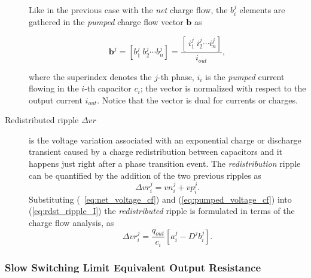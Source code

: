 \begin{description}
      Like in the previous case with the \emph{net} charge flow, the $b_i^j$ elements are gathered in the \emph{pumped} charge flow vector $\mathbf{b}$ as
      
      \begin{equation}
        \mathbf{b}^j =  \left[ b_1^j~b_2^j \cdots b_n^j \right] = \frac{\left[ ~i_1^j~i_2^j \cdots i_n^j \right]}{i_{out}},
      \label{eq:b_vector}
      \end{equation}
      
      where the superindex denotes the $j$-th phase, $i_i$ is the \emph{pumped} current flowing in the $i$-th capacitor $c_i$; the vector is normalized with respect to the output current $i_{out}$. Notice that the vector is dual for currents or charges. 
      

  \item[Redistributed ripple $\Delta vr$ ]is the voltage variation associated with an exponential charge or discharge transient caused by a charge redistribution between capacitors and it happens just right after a phase transition event. The \emph{redistribution} ripple can be quantified by the addition of the two previous ripples as
      \begin{equation}
        \Delta {vr}^j_i  = {vn}^j_i + {vp}^j_i .
      \label{eq:rdst_ripple_I}
      \end{equation}
      Substituting (~\ref{eq:net_voltage_cf}) and (\ref{eq:pumped_voltage_cf}) into (\ref{eq:rdst_ripple_I}) the \emph{redistributed} ripple is formulated in terms of the charge flow analysis, as 
      \begin{equation}
        \Delta {vr}^j_i  = \frac{q_{out}}{c_i} \left[ a^j_i - D^j b^j_i \right] .
      \label{eq:rdst_ripple_II}
      \end{equation}
      
      
\end{description}


\subsubsection[SSL]{Slow Switching Limit Equivalent Output Resistance}

